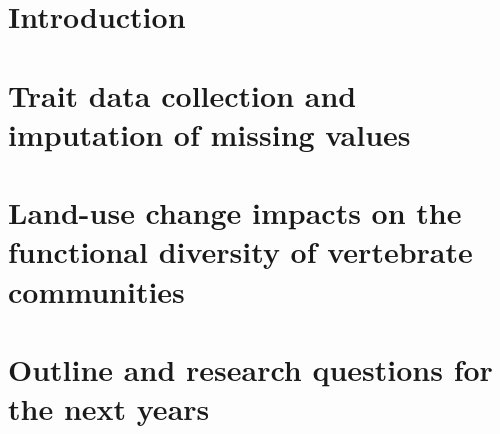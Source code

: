 \documentclass[11pt]{report}
\begin{document}






\clearpage
\tableofcontents


\clearpage
\listoftables

\clearpage
\listoffigures


\clearpage


\chapter{Introduction}
%

\chapter{Trait data collection and imputation of missing values}


\chapter{Land-use change impacts on the functional diversity of vertebrate communities}

\chapter{Outline and research questions for the next years}
\end{document}
